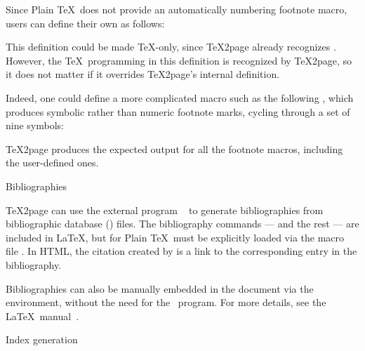 Since Plain \TeX\ does not provide an automatically
numbering footnote macro, users can define their own as
follows:


\n This definition could be made \TeX-only, since
\TeX2page already recognizes \p{\numberedfootnote}.
However, the \TeX\ programming in this definition is
recognized by \TeX2page, so it does not matter if it
overrides \TeX2page’s internal definition.

Indeed, one could define a
more complicated macro such as the following
\p{\sfootnote}, which
produces symbolic rather than
numeric footnote marks, cycling through a set of
nine symbols:


\TeX2page produces the expected output for
all the footnote macros, including the user-defined
ones.

\beginsection Bibliographies

%
\TeX2page
can use the external program \BibTeX~\cite{latex,bibtex} to
generate bibliographies from bibliographic database
() files.  The bibliography commands —
\p{\cite} and the rest — are included in \LaTeX, but
for Plain \TeX\ must be explicitly loaded via the macro
file .  In HTML, the citation created by
\p{\cite} is a link to the corresponding entry in the
bibliography.

Bibliographies can also be manually embedded in the
document via the  environment,
without the need for the \BibTeX\ program.  For
more details, see the \LaTeX\ manual~\cite[sec~4.3.2,
p~71]{latex}.

\beginsection Index generation

